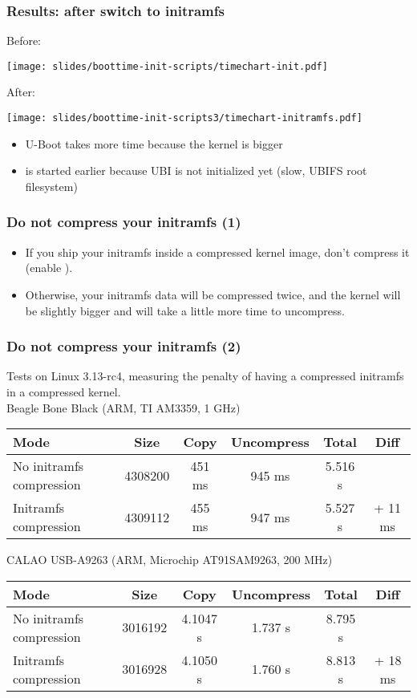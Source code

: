 \begin{frame}
\frametitle{Results: after switch to initramfs}
Before:
\begin{center}
    \texttt{[image: slides/boottime-init-scripts/timechart-init.pdf]}
\end{center}
After:
\begin{center}
    \texttt{[image: slides/boottime-init-scripts3/timechart-initramfs.pdf]}
\end{center}
\begin{itemize}
\item U-Boot takes more time because the kernel is bigger
\item {} is started earlier because UBI is not initialized yet
      (slow, UBIFS root filesystem)
\end{itemize}
\end{frame}

\begin{frame}
\frametitle{Do not compress your initramfs (1)}
\begin{itemize}
\item If you ship your initramfs inside a compressed kernel image, don't compress
      it \\
      (enable ).
\item Otherwise, your initramfs data will be compressed twice, and
      the kernel will be slightly bigger and will take a little more time to uncompress.
\end{itemize}
\end{frame}

\begin{frame}
\frametitle{Do not compress your initramfs (2)}
Tests on Linux 3.13-rc4, measuring the penalty of having a
 compressed initramfs in a  compressed kernel. \\
\vfill{}
\scriptsize
Beagle Bone Black (ARM, TI AM3359, 1 GHz)
\begin{tabular}{| l || c | c | c | c | c | }
\hline
Mode & Size & Copy & Uncompress & Total & Diff \\
\hline
No initramfs compression & 4308200 & 451 ms & 945 ms & 5.516 s & \\
Initramfs compression & 4309112 & 455 ms & 947 ms & 5.527 s & + 11 ms \\
\hline
\end{tabular}
\newline\newline
CALAO USB-A9263 (ARM, Microchip AT91SAM9263, 200 MHz)
\begin{tabular}{| l || c | c | c | c | c | }
\hline
Mode & Size & Copy & Uncompress & Total & Diff \\
\hline
No initramfs compression & 3016192 & 4.1047 s & 1.737 s & 8.795 s & \\
Initramfs compression & 3016928 & 4.1050 s & 1.760 s  & 8.813 s & + 18 ms \\
\hline
\end{tabular}
\end{frame}

